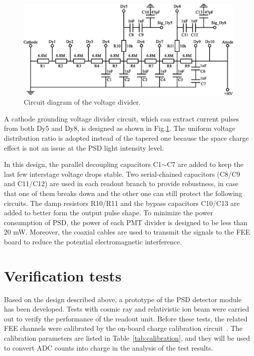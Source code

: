 \documentclass[preprint, times]{elsarticle}
\begin{document}
\begin{figure}
\centering
 \includegraphics[width=130mm]{divider}
\caption{Circuit diagram of the voltage divider.}
\label{fig:divider}
\end{figure}

A cathode grounding voltage divider circuit, which can extract current pulses from both Dy5 and Dy8, is designed as shown in Fig.\ref{fig:divider}.
The uniform voltage distribution ratio is adopted instead of the tapered one because the space charge effect is not an issue at the PSD light intensity level.

In this design, the parallel decoupling capacitors C1$\sim$C7 are added to keep the last few interstage voltage drops stable. Two serial-chained capacitors (C8/C9 and C11/C12) are used in each readout branch to provide robustness, in case that one of them breaks down and the other one can still protect the following circuits. 
The damp resistors R10/R11 and the bypass capacitors C10/C13 are added to better form the output pulse shape. 
To minimize the power consumption of PSD, the power of each PMT divider is designed to be less than 20 mW. 
Moreover, the coaxial cables are used to transmit the signals to the FEE board to reduce the potential electromagnetic interference.


\section{Verification tests}
\label{sec:result}
Based on the design described above, a prototype of the PSD detector module has been developed.
Tests with cosmic ray and relativistic ion beam were carried out to verify the performance of the readout unit.
Before these tests, the related FEE channels were calibrated by the on-board charge calibration circuit~\cite{fee}.
The calibration parameters are listed in Table~\ref{tab:calibration}, and they will be used to convert ADC counts into charge in the analysis of the test results.
\end{document}
